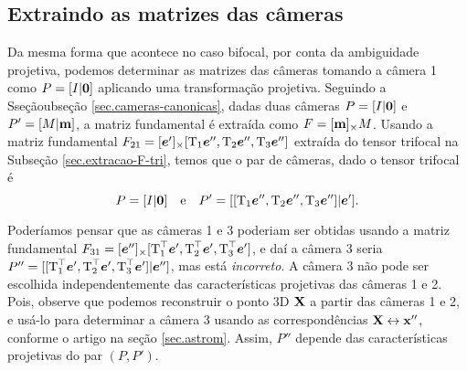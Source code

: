 \subsection{Extraindo as matrizes das câmeras}
Da mesma forma que acontece no caso bifocal, por conta da ambiguidade projetiva, podemos determinar as matrizes das câmeras tomando a câmera 1 como $P=[I|{\bf 0}]$ aplicando uma transformação projetiva. Seguindo a Sseçãoubseção \ref{sec.cameras-canonicas}, dadas duas câmeras $P=[I|{\bf 0}]$ e $P'=[M|{\bf m}]$, a matriz fundamental é extraída como $F=[{\bf m}]_\times M$. Usando a matriz fundamental $F_{21}=[\boldsymbol{e}']_\times[\mbox{T}_1\boldsymbol{e}'',	\mbox{T}_2\boldsymbol{e}'',\mbox{T}_3\boldsymbol{e}'']$ extraída do tensor trifocal na Subseção \ref{sec.extracao-F-tri}, temos que o par de câmeras, dado o tensor trifocal é
\begin{equation}\label{eq.deducao-simples-P-tri}
P=[I|{\bf 0}]\quad\text{e}\quad P'=[[\mbox{T}_1\boldsymbol{e}'',\mbox{T}_2\boldsymbol{e}'',\mbox{T}_3\boldsymbol{e}'']|\boldsymbol{e}'].
\end{equation}

Poderíamos pensar que as câmeras 1 e 3 poderiam ser obtidas usando a matriz fundamental $F_{31}=[\boldsymbol{e}'']_\times[\mbox{T}_1^\top\boldsymbol{e}',\mbox{T}_2^\top\boldsymbol{e}',\mbox{T}_3^\top\boldsymbol{e}']$, e daí a câmera 3 seria $P''=[[\mbox{T}_1^\top\boldsymbol{e}',\mbox{T}_2^\top\boldsymbol{e}',\mbox{T}_3^\top\boldsymbol{e}']|\boldsymbol{e}'']$, mas está {\it incorreto}. A câmera 3 não pode ser escolhida independentemente das características projetivas das câmeras 1 e 2. Pois, observe que podemos reconstruir o ponto 3D $\mathbf{X}$ a partir das câmeras 1 e 2, e usá-lo para determinar a câmera 3 usando as correspondências $\mathbf{X}\leftrightarrow\mathbf{x}''$, conforme o artigo na seção \ref{sec.astrom}. Assim, $P''$ depende das características projetivas do par $(P,P')$. 

